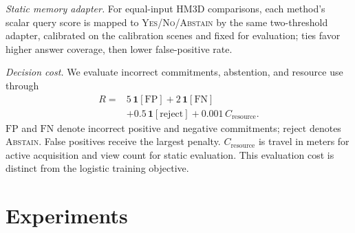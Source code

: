 \documentclass[letterpaper, 10 pt, conference]{ieeeconf}
\begin{document}

\noindent\textit{Static memory adapter.} For equal-input HM3D comparisons, each method's scalar query score is mapped to \textsc{Yes}/\textsc{No}/\textsc{Abstain} by the same two-threshold adapter, calibrated on the calibration scenes and fixed for evaluation; ties favor higher answer coverage, then lower false-positive rate.

\noindent\textit{Decision cost.} We evaluate incorrect commitments, abstention, and resource use through
\begin{equation}
\begin{aligned}
R={}&5\,\mathbf{1}[\mathrm{FP}]+2\,\mathbf{1}[\mathrm{FN}]\\
&+0.5\,\mathbf{1}[\mathrm{reject}]+0.001\,C_{\mathrm{resource}}.
\end{aligned}
\label{eq:risk_cost}
\end{equation}
$\mathrm{FP}$ and $\mathrm{FN}$ denote incorrect positive and negative commitments; $\mathrm{reject}$ denotes \textsc{Abstain}. False positives receive the largest penalty. $C_{\mathrm{resource}}$ is travel in meters for active acquisition and view count for static evaluation. This evaluation cost is distinct from the logistic training objective.


    \section{Experiments}
\end{document}
